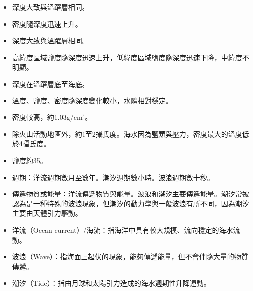 \documentclass[a4paper,12pt]{report}
\begin{document}
\begin{itemize}
\item 深度大致與溫躍層相同。
\item 密度隨深度迅速上升。
\end{itemize}
\begin{itemize}
\item 深度大致與溫躍層相同。
\item 高緯度區域鹽度隨深度迅速上升，低緯度區域鹽度隨深度迅速下降，中緯度不明顯。
\end{itemize}
\begin{itemize}
\item 深度在溫躍層底至海底。
\item 溫度、鹽度、密度隨深度變化較小，水體相對穩定。
\item 密度較高，約1.03g/cm$^3$。
\item 除火山活動地區外，約1至2攝氏度。海水因為鹽類與壓力，密度最大的溫度低於4攝氏度。
\item 鹽度約35\textperthousand。
\end{itemize}
\begin{itemize}
\item 週期：洋流週期數月至數年。潮汐週期數小時。波浪週期數十秒。
\item 傳遞物質或能量：洋流傳遞物質與能量。波浪和潮汐主要傳遞能量。潮汐常被認為是一種特殊的波浪現象，但潮汐的動力學與一般波浪有所不同，因為潮汐主要由天體引力驅動。
\item 洋流（Ocean current）/海流：指海洋中具有較大規模、流向穩定的海水流動。
\item 波浪（Wave）：指海面上起伏的現象，能夠傳遞能量，但不會伴隨大量的物質傳遞。
\item 潮汐（Tide）：指由月球和太陽引力造成的海水週期性升降運動。
\end{itemize}
\end{document}
